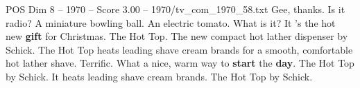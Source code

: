 \begin{textsample}{POS Dim 8 – 1970 – Score 3.00 – 1970/tv\_com\_1970\_58.txt}  \label{ex:f8_pos_081}
Gee, thanks.
Is it radio?
A miniature bowling ball.
An electric tomato.
What is it?
It 's the hot new \textbf{gift} for Christmas.
The Hot Top.
The new compact hot lather dispenser by Schick.
The Hot Top heats leading shave cream brands for a smooth, comfortable hot lather shave.
Terrific.
What a nice, warm way to \textbf{start} the \textbf{day}.
The Hot Top by Schick.
It heats leading shave cream brands.
The Hot Top by Schick.

\end{textsample}
